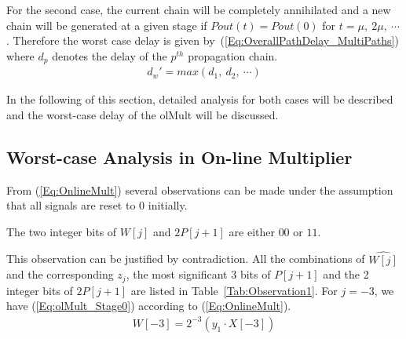 \documentclass[a4paper, 11pt]{article}
\newtheorem{Ob}{\hskip\parindent\bf{Observation}}[]
\begin{document}
For the second case, the current chain will be completely annihilated and a new chain will be generated at a given stage if $Pout(t)=Pout(0)$ for $t=\mu,~2\mu,~\cdots$. Therefore the worst case delay is given by~(\ref{Eq:OverallPathDelay_MultiPaths}) where $d_p$ denotes the delay of the $p^{th}$ propagation chain.
\begin{eqnarray}\label{Eq:OverallPathDelay_MultiPaths}
  d_w'=max(d_1,~d_2,~\cdots)
\end{eqnarray}

In the following of this section, detailed analysis for both cases will be described and the worst-case delay of the olMult will be discussed.
\subsection{Worst-case Analysis in On-line Multiplier}
From (\ref{Eq:OnlineMult}) several observations can be made under the assumption that all signals are reset to $0$ initially. 

\begin{Ob}\label{Ob:Ob1}
    The two integer bits of $W[j]$ and $2P[j+1]$ are either $00$ or $11$.
\end{Ob}

This observation can be justified by contradiction. All the combinations of $\widehat{W[j]}$ and the corresponding $z_j$, the most significant 3 bits of $P[j+1]$ and the 2 integer bits of $2P[j+1]$ are listed in Table~\ref{Tab:Observation1}. For $j=-3$, we have (\ref{Eq:olMult_Stage0}) according to (\ref{Eq:OnlineMult}). 
\begin{eqnarray}\label{Eq:olMult_Stage0}
    W[-3]=2^{-3}(y_1\cdot X[-3])
\end{eqnarray}
\end{document}
